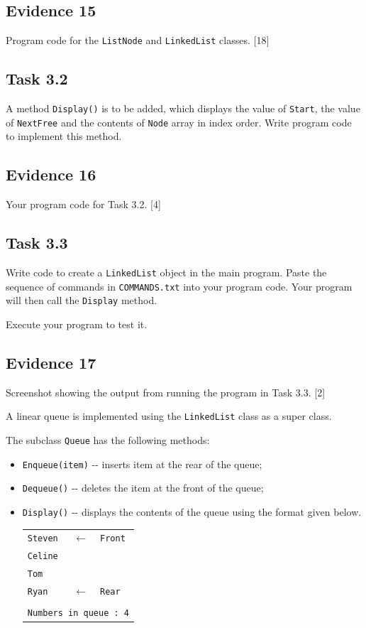 \subsection*{Evidence 15}

Program code for the \texttt{ListNode} and \texttt{LinkedList} classes.
\hfill{}{[}18{]}

\subsection*{Task 3.2 }

A method \texttt{Display()} is to be added, which displays the value
of \texttt{Start}, the value of \texttt{NextFree} and the contents
of \texttt{Node} array in index order. Write program code to implement
this method.

\subsection*{Evidence 16}

Your program code for Task 3.2. \hfill{}{[}4{]}

\subsection*{Task 3.3 }

Write code to create a \texttt{LinkedList} object in the main program.
Paste the sequence of commands in \texttt{COMMANDS.txt} into your
program code. Your program will then call the \texttt{Display} method. 

Execute your program to test it.

\subsection*{Evidence 17 }

Screenshot showing the output from running the program in Task 3.3.
\hfill{}{[}2{]}

A linear queue is implemented using the \texttt{LinkedList} class
as a super class. 

The subclass \texttt{Queue} has the following methods: 
\begin{itemize}
\item \texttt{Enqueue(item)} -{}- inserts item at the rear of the queue;
\item \texttt{Dequeue()} -{}- deletes the item at the front of the queue; 
\item \texttt{Display()} -{}- displays the contents of the queue using the
format given below.
\noindent \begin{center}
\texttt{}%
\begin{tabular}{lcl}
\texttt{Steven} & \texttt{$\leftarrow$} & \texttt{Front}\tabularnewline
\texttt{Celine} &  & \tabularnewline
\texttt{Tom} &  & \tabularnewline
\texttt{Ryan} & \texttt{$\leftarrow$} & \texttt{Rear}\tabularnewline
 &  & \tabularnewline
\multicolumn{3}{l}{\texttt{Numbers in queue : 4}}\tabularnewline
\end{tabular}
\par\end{center}
\end{itemize}

